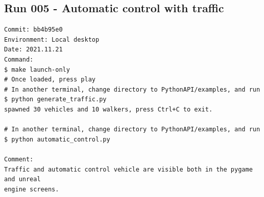 \subsection{Run 005 - Automatic control with traffic}
\label{app_res:005}
\begin{verbatim}
Commit: bb4b95e0
Environment: Local desktop
Date: 2021.11.21
Command:
$ make launch-only
# Once loaded, press play
# In another terminal, change directory to PythonAPI/examples, and run
$ python generate_traffic.py 
spawned 30 vehicles and 10 walkers, press Ctrl+C to exit.

# In another terminal, change directory to PythonAPI/examples, and run
$ python automatic_control.py

Comment:
Traffic and automatic control vehicle are visible both in the pygame and unreal 
engine screens.
\end{verbatim}

